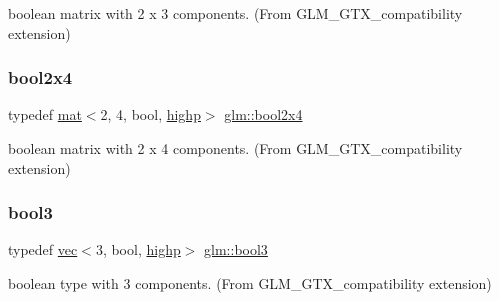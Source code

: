 boolean matrix with 2 x 3 components. (From G\+L\+M\+\_\+\+G\+T\+X\+\_\+compatibility extension) 

\mbox{\label{group__gtx__compatibility_gaa709e6df01dc0ae495c0b5c901a0a181}} 
\subsubsection{\texorpdfstring{bool2x4}{bool2x4}}
{\footnotesize\ttfamily typedef \mbox{\hyperlink{structglm_1_1mat}{mat}}$<$2, 4, bool, \mbox{\hyperlink{namespaceglm_a36ed105b07c7746804d7fdc7cc90ff25ac6f7eab42eacbb10d59a58e95e362074}{highp}}$>$ \mbox{\hyperlink{group__gtx__compatibility_gaa709e6df01dc0ae495c0b5c901a0a181}{glm\+::bool2x4}}}



boolean matrix with 2 x 4 components. (From G\+L\+M\+\_\+\+G\+T\+X\+\_\+compatibility extension) 

\mbox{\label{group__gtx__compatibility_ga9d9411e411bc3bcb7ec64593f5e0908f}} 
\subsubsection{\texorpdfstring{bool3}{bool3}}
{\footnotesize\ttfamily typedef \mbox{\hyperlink{structglm_1_1vec}{vec}}$<$3, bool, \mbox{\hyperlink{namespaceglm_a36ed105b07c7746804d7fdc7cc90ff25ac6f7eab42eacbb10d59a58e95e362074}{highp}}$>$ \mbox{\hyperlink{group__gtx__compatibility_ga9d9411e411bc3bcb7ec64593f5e0908f}{glm\+::bool3}}}



boolean type with 3 components. (From G\+L\+M\+\_\+\+G\+T\+X\+\_\+compatibility extension) 

\mbox{\label{group__gtx__compatibility_ga24674530ea1f5c4e78ba3932dcd7504a}} 
